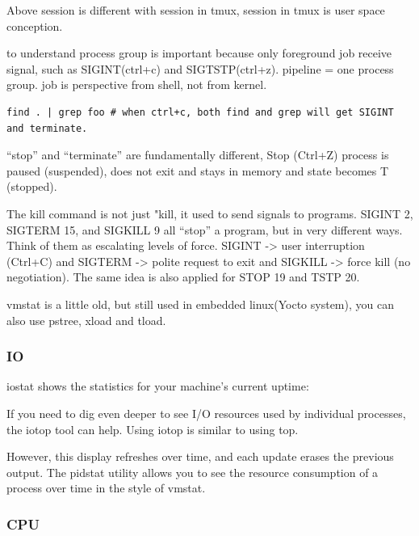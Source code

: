 \documentclass[paper=8.5in:11in, twoside, 12pt, pagesize=pdftex]{book}
\begin{document}
	\par Above session is different with session in tmux, session in tmux is user space conception. 

	\par to understand process group is important because only foreground job receive signal, such as SIGINT(ctrl+c) and SIGTSTP(ctrl+z).  pipeline = one process group. job is perspective from shell, not from kernel. 
	
\begin{lstlisting}
find . | grep foo # when ctrl+c, both find and grep will get SIGINT and terminate. 
\end{lstlisting}
	
	\par “stop” and “terminate” are fundamentally different, Stop (Ctrl+Z) process is paused (suspended), does not exit and stays in memory and state becomes T (stopped). 
	
	\par The kill command is not just "kill, it used to send signals to programs. SIGINT 2, SIGTERM 15, and SIGKILL 9 all “stop” a program, but in very different ways. Think of them as escalating levels of force. SIGINT -> user interruption (Ctrl+C) and SIGTERM -> polite request to exit and SIGKILL -> force kill (no negotiation). The same idea is also applied for STOP 19 and TSTP 20. 
	
	\par vmstat is a little old, but still used in embedded linux(Yocto system), you can also use pstree, xload and tload.

\subsubsection{IO}
	\par iostat shows the statistics for your machine’s current uptime:

	\par If you need to dig even deeper to see I/O resources used by individual processes, the iotop tool can help. Using iotop is similar to using top.

	\par However, this display refreshes over time, and each update
erases the previous output. The pidstat utility allows you to see the resource consumption of a process over time in the style of vmstat.

\subsubsection{CPU}
\end{document}
